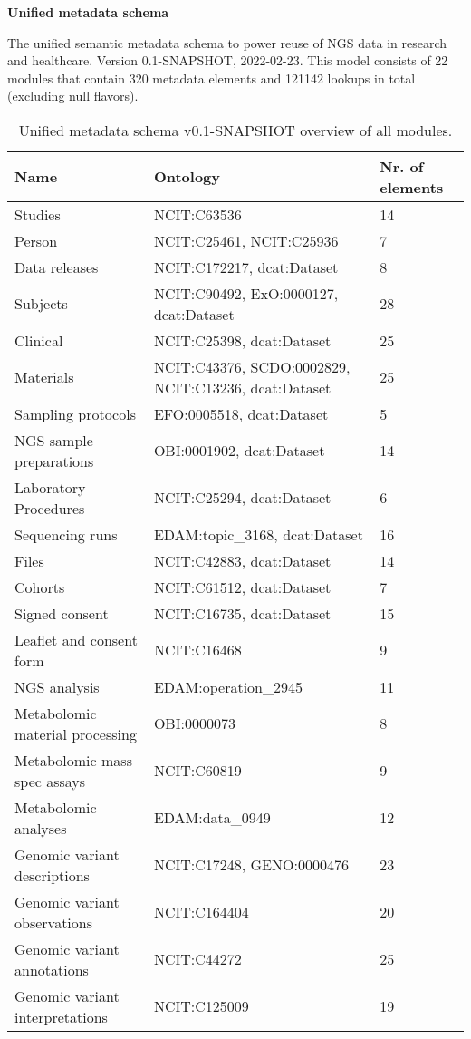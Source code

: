 \documentclass{article}
\begin{document}
\setlength\parindent{0pt}

\textbf{Unified metadata schema}
\newline

The unified semantic metadata schema to power reuse of NGS data in research and healthcare. Version 0.1-SNAPSHOT, 2022-02-23. This model consists of 22 modules that contain 320 metadata elements and 121142 lookups in total (excluding null flavors).

\begin{table}[htb]
\begin{tabular}{lll}
Name & Ontology & Nr. of elements \\
\hline
Studies & NCIT:C63536  & 14 \\
Person & NCIT:C25461, NCIT:C25936  & 7 \\
Data releases & NCIT:C172217, dcat:Dataset  & 8 \\
Subjects & NCIT:C90492, ExO:0000127, dcat:Dataset  & 28 \\
Clinical & NCIT:C25398, dcat:Dataset  & 25 \\
Materials & NCIT:C43376, SCDO:0002829, NCIT:C13236, dcat:Dataset  & 25 \\
Sampling protocols & EFO:0005518, dcat:Dataset  & 5 \\
NGS sample preparations & OBI:0001902, dcat:Dataset  & 14 \\
Laboratory Procedures & NCIT:C25294, dcat:Dataset  & 6 \\
Sequencing runs & EDAM:topic\_3168, dcat:Dataset  & 16 \\
Files & NCIT:C42883, dcat:Dataset  & 14 \\
Cohorts & NCIT:C61512, dcat:Dataset  & 7 \\
Signed consent & NCIT:C16735, dcat:Dataset  & 15 \\
Leaflet and consent form & NCIT:C16468  & 9 \\
NGS analysis & EDAM:operation\_2945  & 11 \\
Metabolomic material processing & OBI:0000073  & 8 \\
Metabolomic mass spec assays & NCIT:C60819  & 9 \\
Metabolomic analyses & EDAM:data\_0949  & 12 \\
Genomic variant descriptions & NCIT:C17248, GENO:0000476  & 23 \\
Genomic variant observations & NCIT:C164404  & 20 \\
Genomic variant annotations & NCIT:C44272  & 25 \\
Genomic variant interpretations & NCIT:C125009  & 19 \\
\hline
\end{tabular}
\caption[Module overview]{\label{table:table1} Unified metadata schema v0.1-SNAPSHOT overview of all modules.}
\end{table}
\end{document}
